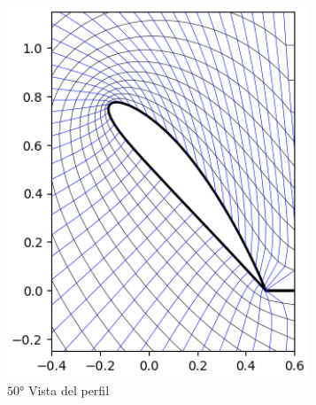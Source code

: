 \documentclass[letterpaper, openright, 12pt]{book}
\begin{document}
    \begin{figure}[htbp!]
        \centering
        \begin{subfigure}[c]{0.45\textwidth}
            \includegraphics[keepaspectratio,
                width=0.99\textwidth]{./img/naca4415_c_50}
            \caption{$50\si{\degree}$ Vista del perfil}
            \label{fig:naca4415_c_50}
        \end{subfigure}
        \hfill
        \begin{subfigure}[c]{0.45\textwidth}

\end{subfigure}
\end{figure}
\end{document}
